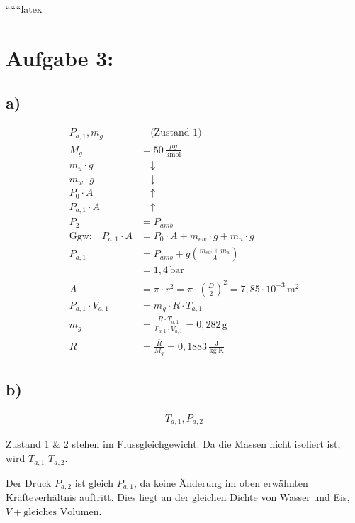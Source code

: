 
``````latex


\section*{Aufgabe 3:}

\subsection*{a)}

\begin{align*}
P_{a,1}, m_g & \quad \text{(Zustand 1)} \\
M_g &= 50 \, \frac{\mu g}{\text{kmol}} \\
m_u \cdot g & \quad \downarrow \\
m_w \cdot g & \quad \downarrow \\
P_0 \cdot A & \quad \uparrow \\
P_{a,1} \cdot A & \quad \uparrow \\
P_2 &= P_{amb} \\
\text{Ggw:} \quad P_{a,1} \cdot A &= P_0 \cdot A + m_{ew} \cdot g + m_u \cdot g \\
P_{a,1} &= P_{amb} + g \left( \frac{m_{ew} + m_u}{A} \right) \\
&= 1,4 \, \text{bar} \\
A &= \pi \cdot r^2 = \pi \cdot \left( \frac{D}{2} \right)^2 = 7,85 \cdot 10^{-3} \, \text{m}^2 \\
P_{a,1} \cdot V_{a,1} &= m_g \cdot R \cdot T_{a,1} \\
m_g &= \frac{R \cdot T_{a,1}}{P_{a,1} \cdot V_{a,1}} = 0,282 \, \text{g} \\
R &= \frac{\bar{R}}{M_g} = 0,1883 \, \frac{\text{J}}{\text{kg} \cdot \text{K}}
\end{align*}

\subsection*{b)}

\begin{align*}
T_{a,1}, P_{a,2}
\end{align*}

Zustand 1 \& 2 stehen im Flussgleichgewicht. Da die Massen nicht isoliert ist, wird $T_{a,1}$  $T_{a,2}$.

Der Druck $P_{a,2}$ ist gleich $P_{a,1}$, da keine Änderung im oben erwähnten Kräfteverhältnis auftritt. Dies liegt an der gleichen Dichte von Wasser und Eis, $V + \text{gleiches Volumen}$.

